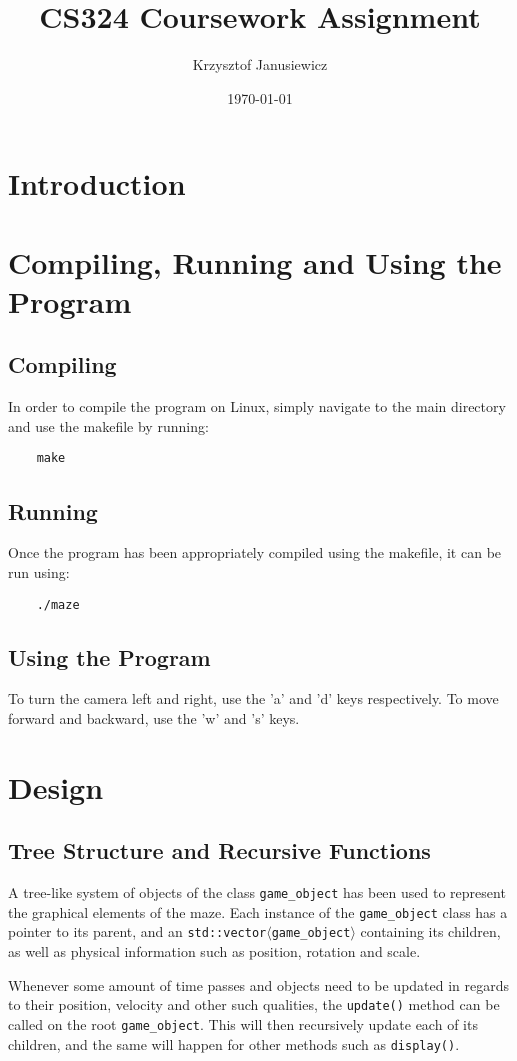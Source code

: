\documentclass{article}
\title{CS324 Coursework Assignment}
\date{\today}
\author{Krzysztof Janusiewicz}
\begin{document}
	\maketitle
	\newpage
	\section{Introduction}

	\newpage
	\section{Compiling, Running and Using the Program}
	\subsection{Compiling}
	In order to compile the program on Linux, simply navigate to the main directory and use the makefile by running:
\begin{lstlisting}
	make
\end{lstlisting}

	\subsection{Running}
Once the program has been appropriately compiled using the makefile, it can be run using:
\begin{lstlisting}
	./maze
\end{lstlisting}

	\subsection{Using the Program}
	To turn the camera left and right, use the 'a' and 'd' keys respectively. To move forward and backward, use the 'w' and 's' keys.
	
	\newpage
	\section{Design}
	\subsection{Tree Structure and Recursive Functions}
	A tree-like system of objects of the class \texttt{game\_object} has been used to represent the graphical elements of the maze.
	Each instance of the \texttt{game\_object} class has a pointer to its parent, and an \texttt{std::vector$\langle$game\_object$\rangle$} containing its children, as well as physical information such as position, rotation and scale.
	\par
	Whenever some amount of time passes and objects need to be updated in regards to their position, velocity and other such qualities, the \texttt{update()} method can be called on the root \texttt{game\_object}.
	This will then recursively update each of its children, and the same will happen for other methods such as \texttt{display()}.
\end{document}
